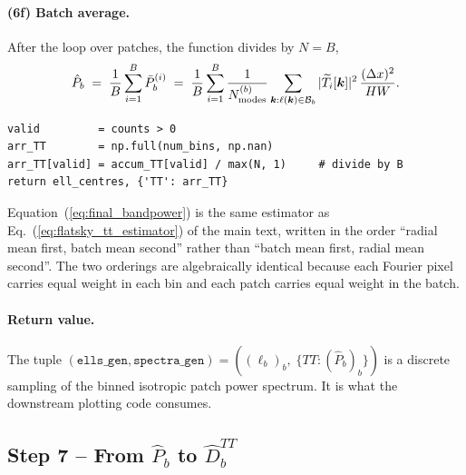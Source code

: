 \documentclass[11pt]{article}
\theoremstyle{definition}
\begin{document}
\paragraph{(6f) Batch average.} After the loop over patches, the function
divides by $N=B$,
\begin{equation}
  \hat P_b \;=\; \frac{1}{B}\sum_{i=1}^{B}\bar P_b^{(i)}
  \;=\; \frac{1}{B}\sum_{i=1}^{B}\frac{1}{N^{(b)}_{\rm modes}}
        \sum_{\bm k:\ell(\bm k)\in\mathcal B_b}
        |\widetilde T_i[\bm k]|^2\,\frac{(\Delta x)^2}{HW}.
  \label{eq:final_bandpower}
\end{equation}
\begin{lstlisting}[style=nb]
valid         = counts > 0
arr_TT        = np.full(num_bins, np.nan)
arr_TT[valid] = accum_TT[valid] / max(N, 1)     # divide by B
return ell_centres, {'TT': arr_TT}
\end{lstlisting}
Equation~(\ref{eq:final_bandpower}) is the same estimator as
Eq.~(\ref{eq:flatsky_tt_estimator}) of the main text, written in the order
``radial mean first, batch mean second'' rather than ``batch mean first,
radial mean second''. The two orderings are algebraically identical because
each Fourier pixel carries equal weight in each bin and each patch carries
equal weight in the batch.

\paragraph{Return value.} The tuple
$(\texttt{ells\_gen},\texttt{spectra\_gen})=
((\ell_b)_b,\;\{TT:(\hat P_b)_b\})$ is a discrete sampling of the binned
isotropic patch power spectrum. It is what the downstream plotting code
consumes.

\subsection{\texorpdfstring{Step 7 -- From $\hat P_b$ to $\hat D_b^{TT}$}{Step 7 -- From P\_b to D\_b\^{}TT}}
\label{sec:vf_step_dell}
\end{document}
